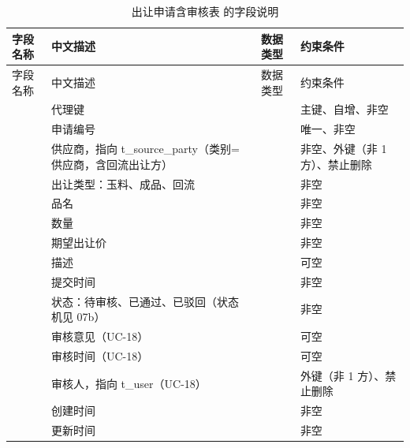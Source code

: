 \begin{longtable}{@{}L{3.5cm} L{4.1cm} L{2.9cm} L{4.0cm}@{}}
\caption{出让申请含审核表  的字段说明}\label{tab:f-t-transfer-apply}\\
\toprule
字段名称 & 中文描述 & 数据类型 & 约束条件 \\
\midrule
\endfirsthead
\toprule
字段名称 & 中文描述 & 数据类型 & 约束条件 \\
\midrule
\endhead
\bottomrule
\endlastfoot
{} & 代理键 &  & 主键、自增、非空 \\
 & 申请编号 &  & 唯一、非空 \\
 & 供应商，指向 t\_source\_party（类别=供应商，含回流出让方） &  & 非空、外键（非 1 方）、禁止删除 \\
 & 出让类型：玉料、成品、回流 &  & 非空 \\
 & 品名 &  & 非空 \\
 & 数量 &  & 非空 \\
 & 期望出让价 &  & 非空 \\
 & 描述 &  & 可空 \\
 & 提交时间 &  & 非空 \\
 & 状态：待审核、已通过、已驳回（状态机见 07b） &  & 非空 \\
 & 审核意见（UC-18） &  & 可空 \\
 & 审核时间（UC-18） &  & 可空 \\
 & 审核人，指向 t\_user（UC-18） &  & 外键（非 1 方）、禁止删除 \\
 & 创建时间 &  & 非空 \\
 & 更新时间 &  & 非空 \\
\end{longtable}

